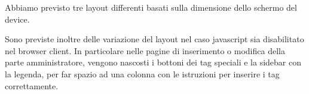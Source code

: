 Abbiamo previsto tre layout differenti basati sulla dimensione dello schermo del device.



Sono previste inoltre delle variazione del layout nel caso javascript sia disabilitato nel browser client. In particolare nelle pagine di inserimento o modifica della parte amministratore, vengono nascosti i bottoni dei tag speciali e la sidebar con la legenda, per far spazio ad una colonna con le istruzioni per inserire i tag correttamente.

